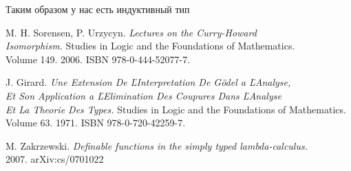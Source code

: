 \documentclass{article}[12pt]
\begin{document}
Таким образом у нас есть индуктивный тип 

\begin{thebibliography}{}
    M. H. Sorensen, P. Urzycyn. \textit{Lectures on the Curry-Howard \\ Isomorphism.}
    Studies in Logic and the Foundations of Mathematics. \\ Volume 149. 2006. ISBN
    978-0-444-52077-7.

    J. Girard. \textit{Une Extension De ĽInterpretation De Gödel a ĽAnalyse, \\ Et Son Application  a ĽElimination Des Coupures Dans ĽAnalyse  \\ Et La Theorie Des Types.}
    Studies in Logic and the Foundations of Mathematics. Volume 63. 1971. ISBN 978-0-720-42259-7.

    M. Zakrzewski. \textit{Definable functions in the simply typed lambda-calculus.} \\ 2007.
    arXiv:cs/0701022
\end{thebibliography}
\end{document}
